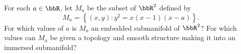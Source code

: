 For each $a\in \bbR$, let $M_a$ be the subset of $\bbR^2$ defined by
\begin{equation*}
M_a = \left\{(x,y):y^2=x(x-1)(x-a)\right\}.
\end{equation*}
For which values of $a$ is $M_a$ an embedded submanifold of $\bbR^2$?  For which values can $M_a$ be given a topology and smooth structure making it into an immersed submanifold?
